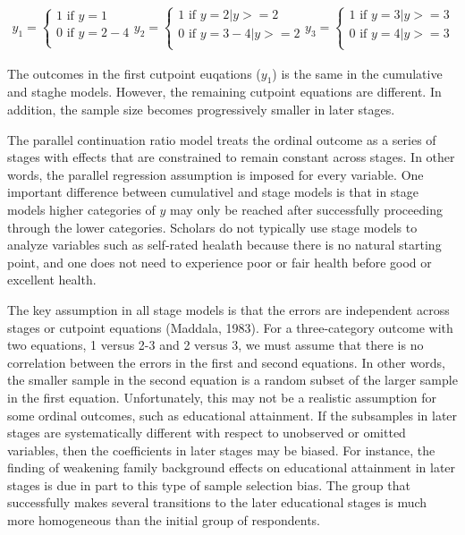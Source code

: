 \begin{eqnarray}
	y_{1} =
	\begin{cases}
	1 \text{ if } y = 1 \nonumber \\
	0 \text{ if } y = 2-4 \nonumber \\
\end{cases}
	y_{2} =
	\begin{cases}
	1 \text{ if } y = 2 | y >= 2 \nonumber \\
	0 \text{ if } y = 3-4 | y >= 2 \nonumber \\
\end{cases}
	y_{3} =
	\begin{cases}
	1 \text{ if } y = 3 | y >= 3 \nonumber \\
	0 \text{ if } y = 4 | y >= 3 \nonumber \\
\end{cases}
\end{eqnarray}

The outcomes in the first cutpoint euqations ($y_{1}$) is the same in the cumulative and staghe models. However, the remaining cutpoint equations are different. In addition, the sample size becomes progressively smaller in later stages.

The parallel continuation ratio model treats the ordinal outcome as a series of stages with effects that are constrained to remain constant across stages. In other words, the parallel regression assumption is imposed for every variable. One important difference between cumulativel and stage models is that in stage models higher categories of $y$ may only be reached after successfully proceeding through the lower categories. Scholars do not typically use stage models to analyze variables such as self-rated healath because there is no natural starting point, and one does not need to experience poor or fair health before good or excellent health.

The key assumption in all stage models is that the errors are independent across stages or cutpoint equations (Maddala, 1983). For a three-category outcome with two equations, 1 versus 2-3 and 2 versus 3, we must assume that there is no correlation between the errors in the first and second equations. In other words, the smaller sample in the second equation is a random subset of the larger sample in the first equation. Unfortunately, this may not be a realistic assumption for some ordinal outcomes, such as educational attainment. If the subsamples in later stages are systematically different with respect to unobserved or omitted variables, then the coefficients in later stages may be biased. For instance, the finding of weakening family background effects on educational attainment in later stages is due in part to this type of sample selection bias. The group that successfully makes several transitions to the later educational stages is much more homogeneous than the initial group of respondents.

